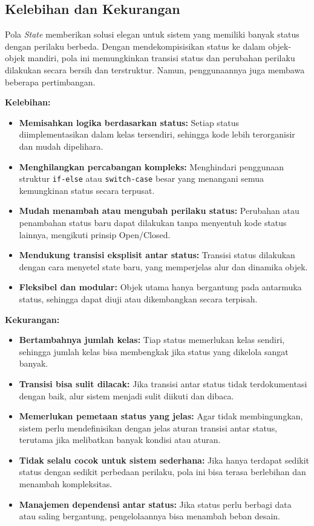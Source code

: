 \subsection{Kelebihan dan Kekurangan}

Pola \textit{State} memberikan solusi elegan untuk sistem yang memiliki banyak status dengan perilaku berbeda. Dengan mendekompisisikan status ke dalam objek-objek mandiri, pola ini memungkinkan transisi status dan perubahan perilaku dilakukan secara bersih dan terstruktur. Namun, penggunaannya juga membawa beberapa pertimbangan.

\textbf{Kelebihan:}
\begin{itemize}
	\item \textbf{Memisahkan logika berdasarkan status:} Setiap status diimplementasikan dalam kelas tersendiri, sehingga kode lebih terorganisir dan mudah dipelihara.
	
	\item \textbf{Menghilangkan percabangan kompleks:} Menghindari penggunaan struktur \texttt{if-else} atau \texttt{switch-case} besar yang menangani semua kemungkinan status secara terpusat.
	
	\item \textbf{Mudah menambah atau mengubah perilaku status:} Perubahan atau penambahan status baru dapat dilakukan tanpa menyentuh kode status lainnya, mengikuti prinsip Open/Closed.
	
	\item \textbf{Mendukung transisi eksplisit antar status:} Transisi status dilakukan dengan cara menyetel state baru, yang memperjelas alur dan dinamika objek.
	
	\item \textbf{Fleksibel dan modular:} Objek utama hanya bergantung pada antarmuka status, sehingga dapat diuji atau dikembangkan secara terpisah.
\end{itemize}

\textbf{Kekurangan:}
\begin{itemize}
	\item \textbf{Bertambahnya jumlah kelas:} Tiap status memerlukan kelas sendiri, sehingga jumlah kelas bisa membengkak jika status yang dikelola sangat banyak.
	
	\item \textbf{Transisi bisa sulit dilacak:} Jika transisi antar status tidak terdokumentasi dengan baik, alur sistem menjadi sulit diikuti dan dibaca.
	
	\item \textbf{Memerlukan pemetaan status yang jelas:} Agar tidak membingungkan, sistem perlu mendefinisikan dengan jelas aturan transisi antar status, terutama jika melibatkan banyak kondisi atau aturan.
	
	\item \textbf{Tidak selalu cocok untuk sistem sederhana:} Jika hanya terdapat sedikit status dengan sedikit perbedaan perilaku, pola ini bisa terasa berlebihan dan menambah kompleksitas.
	
	\item \textbf{Manajemen dependensi antar status:} Jika status perlu berbagi data atau saling bergantung, pengelolaannya bisa menambah beban desain.
\end{itemize}

